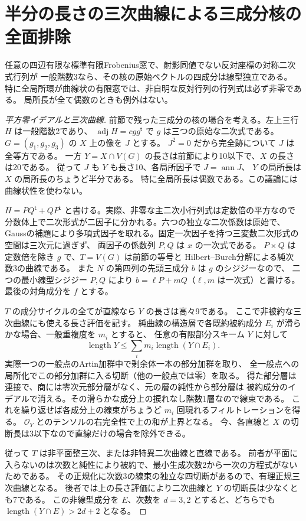 \section{半分の長さの三次曲線による三成分核の全面排除}
\label{sec:ternary-kernel-cubic-exclusion}
\begin{theorem}\label{thm:ternary-kernel-cubic-exclusion}
任意の四辺有限な標準有限Frobenius窓で、射影同値でない反対座標の対称二次式行列が
一般階数3なら、その核の原始ベクトルの四成分は線型独立である。
特に全局所環が曲線状の有限窓では、非自明な反対行列の行列式は必ず非零である。
局所長が全て偶数のときも例外はない。
\end{theorem}
\begin{proof}[平方零イデアルと三次曲線]
前節で残った三成分の核の場合を考える。左上三行 $H$ は一般階数2であり、
$\operatorname{adj}H=cgg^{\mathsf t}$ で $g$ は三つの原始な二次式である。
$G=(g_1,g_2,g_3)$ の $X$ 上の像を $J$ とする。
$J^2=0$ だから完全跡について $J$ は全等方である。
一方 $Y=X\cap V(G)$ の長さは前節により10以下で、$X$ の長さは20である。
従って $J$ も $Y$ も長さ10、各局所因子で $J=\operatorname{ann}J$、
$Y$ の局所長は $X$ の局所長のちょうど半分である。
特に全局所長は偶数である。この議論には曲線状性を使わない。

$H=P Q^{\mathsf t}+Q P^{\mathsf t}$ と書ける。実際、非零な主二次小行列式は定数倍の平方なので
分数体上で二次形式が二因子に分かれる。六つの独立な二次係数は原始で、
Gaussの補題により多項式因子を取れる。固定一次因子を持つ三変数二次形式の空間は三次元に過ぎず、
両因子の係数列 $P,Q$ は $x$ の一次式である。
$P\times Q$ は定数倍を除き $g$ で、$T=V(G)$ は前節の等号と
Hilbert--Burch分解による純次数3の曲線である。
また $N$ の第四列の先頭三成分 $b$ は $g$ のシジジーなので、
二つの最小線型シジジー $P,Q$ により $b=\ell P+mQ$（$\ell,m$ は一次式）と書ける。
最後の対角成分を $f$ とする。

$T$ の成分サイクルの全てが直線なら $Y$ の長さは高々9である。
ここで非被約な三次曲線にも使える長さ評価を記す。
純曲線の構造層で各既約被約成分 $E_i$ が滑らかな場合、一般重複度を $m_i$ とすると、
任意の有限部分スキーム $Y$ に対して
\[
              \operatorname{length}Y\le
              \sum_i m_i\operatorname{length}(Y\cap E_i).
\]
実際一つの一般点のArtin加群中で剰余体一本の部分加群を取り、
全一般点への局所化でこの部分加群に入る切断（他の一般点では零）を取る。
得た部分層は連接で、商には零次元部分層がなく、元の層の純性から部分層は
被約成分のイデアルで消える。その滑らかな成分上の捩れなし階数1層なので線束である。
これを繰り返せば各成分上の線束がちょうど $m_i$ 回現れるフィルトレーションを得る。
$\mathcal O_Y$ とのテンソルの右完全性で上の和が上界となる。
今、各直線と $X$ の切断長は3以下なので直線だけの場合を除外できる。

従って $T$ は非平面整三次、または非特異二次曲線と直線である。
前者が平面に入らないのは次数と純性により被約で、最小生成次数2から一次の方程式がないためである。
その正規化に次数3の線束の独立な四切断があるので、有理正規三次曲線となる。
後者では上の長さ評価により二次曲線と $Y$ の切断長は少なくとも7である。
この非線型成分を $E$、次数を $d=3,2$ とすると、どちらでも
$\operatorname{length}(Y\cap E)>2d+2$ となる。
\end{proof}

